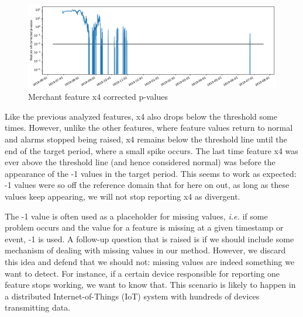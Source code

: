\begin{figure}[!htb]
    \begin{center}
      \includegraphics[scale=0.5]{figures/merchant-x4-correctedpvalues.pdf}
      \caption{Merchant feature x4 corrected p-values}
      \label{fig:merchant-x4-correctedpvalues}
    \end{center}
\end{figure}
Like the previous analyzed features, x4 also drops below the threshold some times. However, unlike the other features, where feature values return to normal and alarms stopped being raised, x4 remains below the threshold line until the end of the target period, where a small spike occurs. The last time feature x4 was ever above the threshold line (and hence considered normal) was before the appearance of the -1 values in the target period. This seems to work as expected: -1 values were so off the reference domain that for here on out, as long as these values keep appearing, we will not stop reporting x4 as divergent.

The -1 value is often used as a placeholder for missing values, \textit{i.e.} if some problem occurs and the value for a feature is missing at a given timestamp or event, -1 is used. A follow-up question that is raised is if we should include some mechanism of dealing with missing values in our method. However, we discard this idea and defend that we should not: missing values are indeed something we want to detect. For instance, if a certain device responsible for reporting one feature stops working, we want to know that. This scenario is likely to happen in a distributed Internet-of-Things (IoT) system with hundreds of devices transmitting data. 

